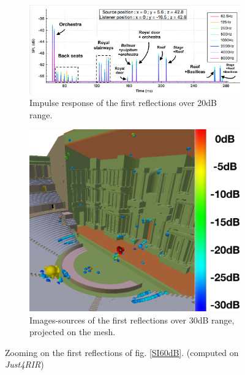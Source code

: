 \documentclass[AMA,STIX1COL]{WileyNJD-v2}
\begin{document}
\begin{figure}[t]
\centering
	\begin{subfigure}{0.63\textwidth}
		\includegraphics[width=\linewidth]{rirTheatre20}
		\caption{Impulse response of the first reflections over 20dB range.}	
		\label{RIR20dB}
	\end{subfigure}
	\begin{subfigure}{0.36\textwidth}
		\includegraphics[width=\linewidth]{SI30dB}
		\caption{Images-sources of the first reflections over 30dB range, projected on the mesh.}
		\label{SI30dB}
	\end{subfigure}
	\caption{Zooming on the first reflections of fig. \ref{SI60dB}. (computed on \textit{Just4RIR})}
	\label{SItheater}
\end{figure}
\end{document}
